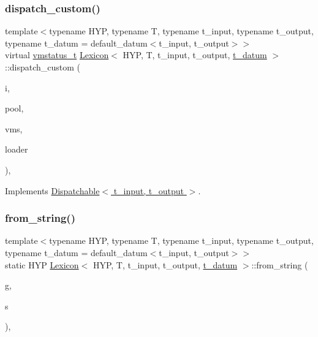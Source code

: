 \subsubsection{\texorpdfstring{dispatch\+\_\+custom()}{dispatch\_custom()}}
{\footnotesize\ttfamily template$<$typename H\+YP, typename T, typename t\+\_\+input, typename t\+\_\+output, typename t\+\_\+datum = default\+\_\+datum$<$t\+\_\+input, t\+\_\+output$>$$>$ \\
virtual \hyperlink{_instruction_8h_a6202215407ab29590bb936ca2996cf64}{vmstatus\+\_\+t} \hyperlink{class_lexicon}{Lexicon}$<$ H\+YP, T, t\+\_\+input, t\+\_\+output, \hyperlink{class_bayesable_a7c93a2eeab708378eb321745908718d4}{t\+\_\+datum} $>$\+::dispatch\+\_\+custom (\begin{DoxyParamCaption}\item[{\hyperlink{class_instruction}{Instruction}}]{i,  }\item[{\hyperlink{class_virtual_machine_pool}{Virtual\+Machine\+Pool}$<$ t\+\_\+input, t\+\_\+output $>$ $\ast$}]{pool,  }\item[{\hyperlink{class_virtual_machine_state}{Virtual\+Machine\+State}$<$ t\+\_\+input, t\+\_\+output $>$ $\ast$}]{vms,  }\item[{\hyperlink{class_dispatchable}{Dispatchable}$<$ t\+\_\+input, t\+\_\+output $>$ $\ast$}]{loader }\end{DoxyParamCaption})\hspace{0.3cm}{\ttfamily [inline]}, {\ttfamily [virtual]}}



Implements \hyperlink{class_dispatchable_a6d2bd844b0e55378d29ed85e718d0a77}{Dispatchable$<$ t\+\_\+input, t\+\_\+output $>$}.

\mbox{\label{class_lexicon_a1a78d0be4350165b5757201b411f94f8}} 
\subsubsection{\texorpdfstring{from\+\_\+string()}{from\_string()}}
{\footnotesize\ttfamily template$<$typename H\+YP, typename T, typename t\+\_\+input, typename t\+\_\+output, typename t\+\_\+datum = default\+\_\+datum$<$t\+\_\+input, t\+\_\+output$>$$>$ \\
static H\+YP \hyperlink{class_lexicon}{Lexicon}$<$ H\+YP, T, t\+\_\+input, t\+\_\+output, \hyperlink{class_bayesable_a7c93a2eeab708378eb321745908718d4}{t\+\_\+datum} $>$\+::from\+\_\+string (\begin{DoxyParamCaption}\item[{\hyperlink{class_grammar}{Grammar} \&}]{g,  }\item[{std\+::string}]{s }\end{DoxyParamCaption})\hspace{0.3cm}{\ttfamily [inline]}, {\ttfamily [static]}}

